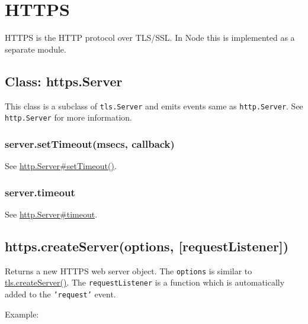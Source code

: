 \section{HTTPS}\label{https}

\begin{Shaded}
\begin{Highlighting}[]
 
\end{Highlighting}
\end{Shaded}

HTTPS is the HTTP protocol over TLS/SSL. In Node this is implemented as
a separate module.

\subsection{Class: https.Server}\label{class-https.server}

This class is a subclass of \texttt{tls.Server} and emits events same as
\texttt{http.Server}. See \texttt{http.Server} for more information.

\subsubsection{server.setTimeout(msecs,
callback)}\label{server.settimeoutmsecs-callback}

See
\href{http.html\#http_server_settimeout_msecs_callback}{http.Server\#setTimeout()}.

\subsubsection{server.timeout}\label{server.timeout}

See \href{http.html\#http_server_timeout}{http.Server\#timeout}.

\subsection{https.createServer(options,
{[}requestListener{]})}\label{https.createserveroptions-requestlistener}

Returns a new HTTPS web server object. The \texttt{options} is similar
to
\href{tls.html\#tls_tls_createserver_options_secureconnectionlistener}{tls.createServer()}.
The \texttt{requestListener} is a function which is automatically added
to the \texttt{'request'} event.

Example:


